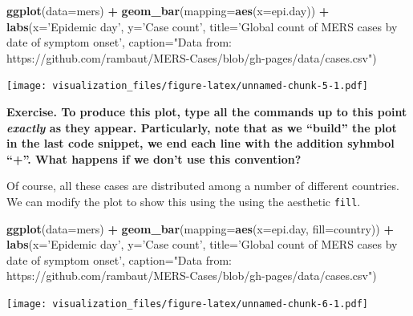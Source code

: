 \documentclass[]{article}
\newenvironment{Shaded}{\begin{snugshade}}{\end{snugshade}}
\newcommand{\KeywordTok}[1]{\textcolor[rgb]{0.13,0.29,0.53}{\textbf{#1}}}
\newcommand{\DataTypeTok}[1]{\textcolor[rgb]{0.13,0.29,0.53}{#1}}
\newcommand{\StringTok}[1]{\textcolor[rgb]{0.31,0.60,0.02}{#1}}
\newcommand{\OperatorTok}[1]{\textcolor[rgb]{0.81,0.36,0.00}{\textbf{#1}}}
\newcommand{\NormalTok}[1]{#1}
\begin{document}
\begin{Shaded}
\begin{Highlighting}[]
\KeywordTok{ggplot}\NormalTok{(}\DataTypeTok{data=}\NormalTok{mers) }\OperatorTok{+}\StringTok{ }
\StringTok{  }\KeywordTok{geom_bar}\NormalTok{(}\DataTypeTok{mapping=}\KeywordTok{aes}\NormalTok{(}\DataTypeTok{x=}\NormalTok{epi.day)) }\OperatorTok{+}
\StringTok{  }\KeywordTok{labs}\NormalTok{(}\DataTypeTok{x=}\StringTok{'Epidemic day'}\NormalTok{, }\DataTypeTok{y=}\StringTok{'Case count'}\NormalTok{, }\DataTypeTok{title=}\StringTok{'Global count of MERS cases by date of symptom onset'}\NormalTok{,}
       \DataTypeTok{caption=}\StringTok{"Data from: https://github.com/rambaut/MERS-Cases/blob/gh-pages/data/cases.csv"}\NormalTok{)}
\end{Highlighting}
\end{Shaded}

\texttt{[image: visualization\_files/figure-latex/unnamed-chunk-5-1.pdf]}

\textbf{Exercise. To produce this plot, type all the commands up to this
point \emph{exactly} as they appear. Particularly, note that as we
``build'' the plot in the last code snippet, we end each line with the
addition syhmbol ``+''. What happens if we don't use this convention?}

Of course, all these cases are distributed among a number of different
countries. We can modify the plot to show this using the using the
aesthetic \texttt{fill}.

\begin{Shaded}
\begin{Highlighting}[]
\KeywordTok{ggplot}\NormalTok{(}\DataTypeTok{data=}\NormalTok{mers) }\OperatorTok{+}\StringTok{ }
\StringTok{  }\KeywordTok{geom_bar}\NormalTok{(}\DataTypeTok{mapping=}\KeywordTok{aes}\NormalTok{(}\DataTypeTok{x=}\NormalTok{epi.day, }\DataTypeTok{fill=}\NormalTok{country)) }\OperatorTok{+}
\StringTok{  }\KeywordTok{labs}\NormalTok{(}\DataTypeTok{x=}\StringTok{'Epidemic day'}\NormalTok{, }\DataTypeTok{y=}\StringTok{'Case count'}\NormalTok{, }\DataTypeTok{title=}\StringTok{'Global count of MERS cases by date of symptom onset'}\NormalTok{,}
       \DataTypeTok{caption=}\StringTok{"Data from: https://github.com/rambaut/MERS-Cases/blob/gh-pages/data/cases.csv"}\NormalTok{)}
\end{Highlighting}
\end{Shaded}

\texttt{[image: visualization\_files/figure-latex/unnamed-chunk-6-1.pdf]}
\end{document}
